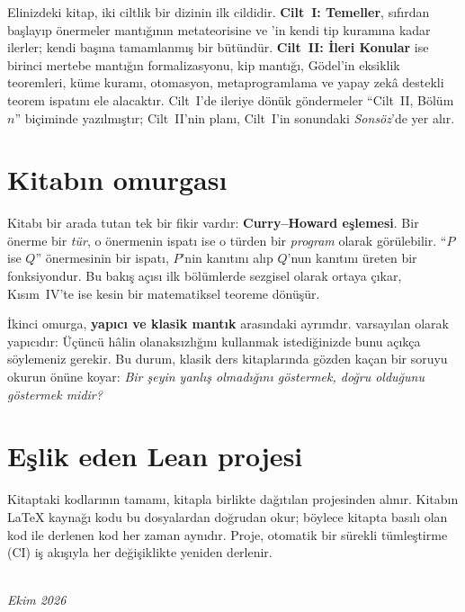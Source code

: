 Elinizdeki kitap, iki ciltlik bir dizinin ilk cildidir. \textbf{Cilt~I:
Temeller}, sıfırdan başlayıp önermeler mantığının metateorisine ve
\Lean{}'in kendi tip kuramına kadar ilerler; kendi başına tamamlanmış bir
bütündür. \textbf{Cilt~II: İleri Konular} ise birinci mertebe mantığın
formalizasyonu, kip mantığı, Gödel'in eksiklik teoremleri, küme kuramı,
otomasyon, metaprogramlama ve yapay zekâ destekli teorem ispatını ele
alacaktır. Cilt~I'de ileriye dönük göndermeler ``Cilt~II, Bölüm~$n$''
biçiminde yazılmıştır; Cilt~II'nin planı, Cilt~I'in sonundaki
\emph{Sonsöz}'de yer alır.

\section*{Kitabın omurgası}

Kitabı bir arada tutan tek bir fikir vardır: \textbf{Curry--Howard eşlemesi}.
Bir önerme bir \emph{tür}, o önermenin ispatı ise o türden bir \emph{program}
olarak görülebilir. ``$P$ ise $Q$'' önermesinin bir ispatı, $P$'nin
kanıtını alıp $Q$'nun kanıtını üreten bir fonksiyondur. Bu bakış açısı ilk
bölümlerde sezgisel olarak ortaya çıkar, Kısım~IV'te ise kesin bir matematiksel
teoreme dönüşür.

İkinci omurga, \textbf{yapıcı ve klasik mantık} arasındaki ayrımdır. \Lean{}
varsayılan olarak yapıcıdır: Üçüncü hâlin olanaksızlığını kullanmak
istediğinizde bunu açıkça söylemeniz gerekir. Bu durum, klasik ders
kitaplarında gözden kaçan bir soruyu okurun önüne koyar: \emph{Bir şeyin
yanlış olmadığını göstermek, doğru olduğunu göstermek midir?}

\section*{Eşlik eden Lean projesi}

Kitaptaki \Lean{} kodlarının tamamı, kitapla birlikte dağıtılan
 projesinden alınır. Kitabın \LaTeX{} kaynağı kodu bu
dosyalardan doğrudan okur; böylece kitapta basılı olan kod ile derlenen kod
her zaman aynıdır. Proje, otomatik bir sürekli tümleştirme (CI) iş akışıyla
her değişiklikte yeniden derlenir.

\vspace{1em}
\begin{flushright}
\yazar\\
\textit{Ekim 2026}
\end{flushright}
